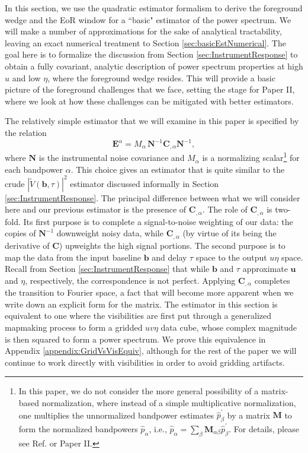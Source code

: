 \documentclass[twocolumn,aps,prd,nofootinbib,showpacs]{revtex4-1}
\begin{document}
In this section, we use the quadratic estimator formalism to derive the foreground wedge and the EoR window for a ``basic" estimator of the power spectrum.  We will make a number of approximations for the sake of analytical tractability, leaving an exact numerical treatment to Section \ref{sec:basicEstNumerical}.  The goal here is to formalize the discussion from Section \ref{sec:InstrumentResponse} to obtain a fully covariant, analytic description of power spectrum properties at high $u$ and low $\eta$, where the foreground wedge resides.  This will provide a basic picture of the foreground challenges that we face, setting the stage for Paper II, where we look at how these challenges can be mitigated with better estimators.

The relatively simple estimator that we will examine in this paper is specified by the relation
\begin{equation}
\label{eq:basicEstEalpha}
\mathbf{E}^\alpha = M_\alpha\, \mathbf{N}^{-1} \mathbf{C}_{,\alpha} \mathbf{N}^{-1},
\end{equation}
where $\mathbf{N}$ is the instrumental noise covariance and $M_\alpha$ is a normalizing scalar\footnote{In this paper, we do not consider the more general possibility of a matrix-based normalization, where instead of a simple multiplicative normalization, one multiplies the unnormalized bandpower estimates $\hat{p}_\beta^\prime$ by a matrix $\mathbf{M}$ to form the normalized bandpowers $\hat{p}_\alpha$, i.e., $\hat{p}_\alpha = \sum_\beta \mathbf{M}_{\alpha \beta} \hat{p}_\beta^\prime$.  For details, please see Ref. \cite{Dillon2014} or Paper II.} for each bandpower $\alpha$.  This choice gives an estimator that is quite similar to the crude $| \widetilde{V} (\mathbf{b}, \tau) |^2$ estimator discussed informally in Section \ref{sec:InstrumentResponse}.  The principal difference between what we will consider here and our previous estimator is the presence of $\mathbf{C}_{,\alpha}$.  The role of $\mathbf{C}_{,\alpha}$ is two-fold.  Its first purpose is to complete a signal-to-noise weighting of our data: the copies of $\mathbf{N}^{-1}$ downweight noisy data, while $\mathbf{C}_{,\alpha}$ (by virtue of its being the derivative of $\mathbf{C}$) upweights the high signal portions.  The second purpose is to map the data from the input baseline $\mathbf{b}$ and delay $\tau$ space to the output $u\eta$ space.  Recall from Section \ref{sec:InstrumentResponse} that while $\mathbf{b}$ and $\tau$ approximate $\mathbf{u}$ and $\eta$, respectively, the correspondence is not perfect.  Applying $\mathbf{C}_{,\alpha}$ completes the transition to Fourier space, a fact that will become more apparent when we write down an explicit form for the matrix.  The estimator in this section is equivalent to one where the visibilities are first put through a generalized mapmaking process to form a gridded $uv\eta$ data cube, whose complex magnitude is then squared to form a power spectrum.  We prove this equivalence in Appendix \ref{appendix:GridVsVisEquiv}, although for the rest of the paper we will continue to work directly with visibilities in order to avoid gridding artifacts.
\end{document}
